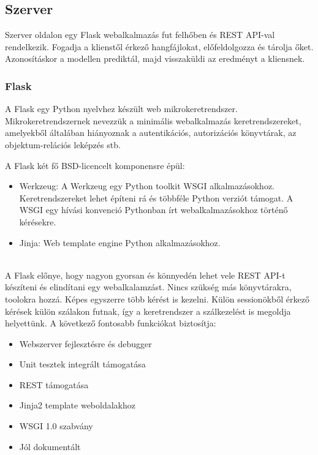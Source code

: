 \subsection{Szerver}

Szerver oldalon egy Flask webalkalmazás fut felhőben és REST API-val rendelkezik. Fogadja a klienstől érkező hangfájlokat, előfeldolgozza és tárolja őket. Azonosításkor a modellen prediktál, majd visszaküldi az eredményt a kliensnek.

\subsubsection{Flask}

A Flask egy Python nyelvhez készült web mikrokeretrendszer. Mikrokeretrendszernek nevezzük a minimális webalkalmazás keretrendszereket, amelyekből általában hiányoznak a autentikációs, autorizációs könyvtárak, az objektum-relációs leképzés stb.

A Flask két fő BSD-licencelt komponensre épül:

\begin{itemize}
	\item Werkzeug: A Werkzeug egy Python toolkit WSGI alkalmazásokhoz. Keretrendszereket lehet építeni rá és többféle Python verziót támogat. A WSGI egy hívási konvenció Pythonban írt webalkalmazásokhoz történő kérésekre.
	\item Jinja: Web template engine Python alkalmazásokhoz.
\end{itemize}
\ \\
A Flask előnye, hogy nagyon gyorsan és könnyedén lehet vele REST API-t készíteni és elindítani egy webalkalamzást. Nincs szükség más könyvtárakra, toolokra hozzá.
\newline
\newline
Képes egyszerre több kérést is kezelni. Külön sessionökből érkező kérések külön szálakon futnak, így a keretrendszer a szálkezelést is megoldja helyettünk. A következő fontosabb funkciókat biztosítja:

\begin{itemize}
	\item Webszerver fejlesztésre és debugger
	\item Unit tesztek integrált támogatása
	\item REST támogatása
	\item Jinja2 template weboldalakhoz
	\item WSGI 1.0 szabvány
	\item Jól dokumentált
\end{itemize}

